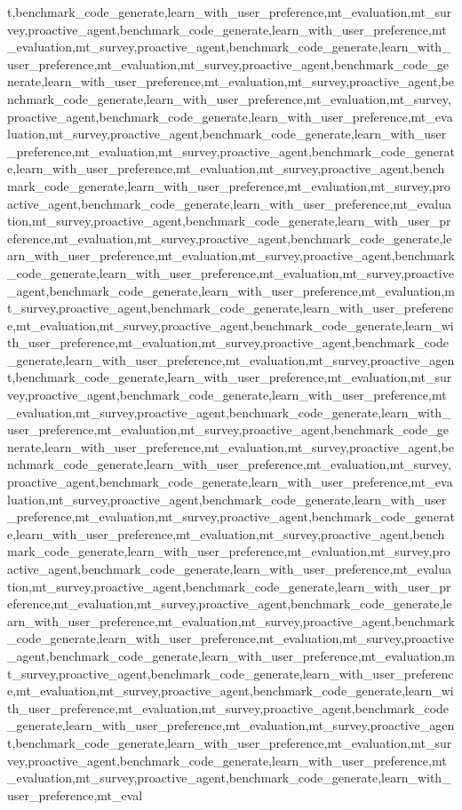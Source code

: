 t,benchmark_code_generate,learn_with_user_preference,mt_evaluation,mt_survey,proactive_agent,benchmark_code_generate,learn_with_user_preference,mt_evaluation,mt_survey,proactive_agent,benchmark_code_generate,learn_with_user_preference,mt_evaluation,mt_survey,proactive_agent,benchmark_code_generate,learn_with_user_preference,mt_evaluation,mt_survey,proactive_agent,benchmark_code_generate,learn_with_user_preference,mt_evaluation,mt_survey,proactive_agent,benchmark_code_generate,learn_with_user_preference,mt_evaluation,mt_survey,proactive_agent,benchmark_code_generate,learn_with_user_preference,mt_evaluation,mt_survey,proactive_agent,benchmark_code_generate,learn_with_user_preference,mt_evaluation,mt_survey,proactive_agent,benchmark_code_generate,learn_with_user_preference,mt_evaluation,mt_survey,proactive_agent,benchmark_code_generate,learn_with_user_preference,mt_evaluation,mt_survey,proactive_agent,benchmark_code_generate,learn_with_user_preference,mt_evaluation,mt_survey,proactive_agent,benchmark_code_generate,learn_with_user_preference,mt_evaluation,mt_survey,proactive_agent,benchmark_code_generate,learn_with_user_preference,mt_evaluation,mt_survey,proactive_agent,benchmark_code_generate,learn_with_user_preference,mt_evaluation,mt_survey,proactive_agent,benchmark_code_generate,learn_with_user_preference,mt_evaluation,mt_survey,proactive_agent,benchmark_code_generate,learn_with_user_preference,mt_evaluation,mt_survey,proactive_agent,benchmark_code_generate,learn_with_user_preference,mt_evaluation,mt_survey,proactive_agent,benchmark_code_generate,learn_with_user_preference,mt_evaluation,mt_survey,proactive_agent,benchmark_code_generate,learn_with_user_preference,mt_evaluation,mt_survey,proactive_agent,benchmark_code_generate,learn_with_user_preference,mt_evaluation,mt_survey,proactive_agent,benchmark_code_generate,learn_with_user_preference,mt_evaluation,mt_survey,proactive_agent,benchmark_code_generate,learn_with_user_preference,mt_evaluation,mt_survey,proactive_agent,benchmark_code_generate,learn_with_user_preference,mt_evaluation,mt_survey,proactive_agent,benchmark_code_generate,learn_with_user_preference,mt_evaluation,mt_survey,proactive_agent,benchmark_code_generate,learn_with_user_preference,mt_evaluation,mt_survey,proactive_agent,benchmark_code_generate,learn_with_user_preference,mt_evaluation,mt_survey,proactive_agent,benchmark_code_generate,learn_with_user_preference,mt_evaluation,mt_survey,proactive_agent,benchmark_code_generate,learn_with_user_preference,mt_evaluation,mt_survey,proactive_agent,benchmark_code_generate,learn_with_user_preference,mt_evaluation,mt_survey,proactive_agent,benchmark_code_generate,learn_with_user_preference,mt_evaluation,mt_survey,proactive_agent,benchmark_code_generate,learn_with_user_preference,mt_evaluation,mt_survey,proactive_agent,benchmark_code_generate,learn_with_user_preference,mt_evaluation,mt_survey,proactive_agent,benchmark_code_generate,learn_with_user_preference,mt_evaluation,mt_survey,proactive_agent,benchmark_code_generate,learn_with_user_preference,mt_evaluation,mt_survey,proactive_agent,benchmark_code_generate,learn_with_user_preference,mt_evaluation,mt_survey,proactive_agent,benchmark_code_generate,learn_with_user_preference,mt_evaluation,mt_survey,proactive_agent,benchmark_code_generate,learn_with_user_preference,mt_eval